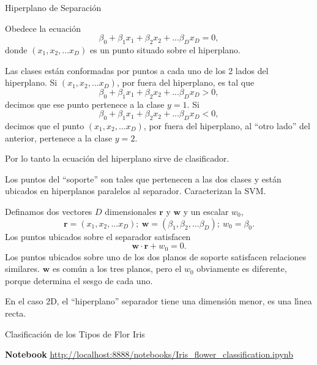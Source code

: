 \documentclass[10pd,hyperref={colorlinks=true}]{beamer}
\begin{document}
 \begin{frame}{Hiperplano de Separaci\'on}

 Obedece la ecuaci\'on
 $$
 \beta_0 + \beta_1x_1 + \beta_2x_2 + ... \beta_Dx_D = 0,
 $$
 donde $(x_1,x_2,...x_D)$ es un punto situado sobre el hiperplano.

 Las clases est\'an conformadas por puntos a cada uno de los 2 lados del 
hiperplano. Si $(x_1,x_2,...x_D)$, por fuera del hiperplano, es tal que
 $$
 \beta_0 + \beta_1x_1 + \beta_2x_2 + ... \beta_Dx_D > 0,
 $$
 decimos que ese punto pertenece a la clase $y=1$.
Si 
 $$
 \beta_0 + \beta_1x_1 + \beta_2x_2 + ... \beta_Dx_D < 0,
 $$
 decimos que el punto $(x_1,x_2,...x_D)$, por fuera del hiperplano, al 
``otro lado'' del anterior, pertenece a la clase $y=2$.

Por lo tanto la ecuaci\'on del hiperplano sirve de clasificador.

 \end{frame}


 \begin{frame}{}

Los puntos del ``soporte'' son tales que pertenecen a las dos clases y 
est\'an ubicados en hiperplanos paralelos al separador. Caracterizan la 
SVM.

Definamos dos vectores $D$ dimensionales $\bm{r}$ y $\bm{w}$ y un 
escalar $w_0$,
 $$
 \bm{r} = (x_1, x_2, ... x_D); \
 \bm{w} = (\beta_1, \beta_2, ... \beta_D);\
 w_0 = \beta_0.
 $$
 Los puntos ubicados sobre el separador satisfacen
 $$
 \bm{w}\cdot\bm{r} + w_0 = 0.
 $$
 Los puntos ubicados sobre uno de los dos planos de soporte satisfacen 
relaciones similares. $\bm{w}$ es com\'un a los tres planos, pero el 
$w_0$ obviamente es diferente, porque determina el sesgo de cada uno.

En el caso 2D, el ``hiperplano'' separador tiene una dimensi\'on menor, 
es una l\'{\i}nea recta.

 \end{frame}


\begin{frame}{Clasificaci\'on de los Tipos de Flor Iris}

 \vfill

\centerline{\textbf{Notebook} \url{http://localhost:8888/notebooks/Iris_flower_classification.ipynb}}

 \vfill

 \end{frame}
\end{document}
